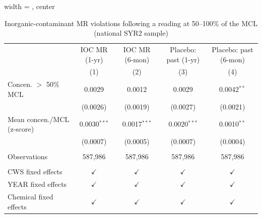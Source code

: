 
\begin{table}[htbp]
\caption{Inorganic-contaminant MR violations following a reading at 50--100\% of the MCL (national SYR2 sample)}\label{tab:mr_concentration_lag_national_ioc}
\centering
\begin{adjustbox}{width = \textwidth, center}
   \begin{tabular}{lcccc}
      \toprule    
                                  & IOC MR (1-yr)   & IOC MR (6-mon)      & Placebo: past (1-yr) & Placebo: past (6-mon) \\   
                                  & (1)             & (2)                 & (3)                  & (4)\\  
      \midrule 
      Concen. $>$ 50\% MCL                   & 0.0029          & 0.0012              & 0.0029               & 0.0042$^{**}$\\   
                                  & (0.0026)        & (0.0019)            & (0.0027)             & (0.0021)\\   
      Mean concen./MCL (z-score)              & 0.0030$^{***}$  & 0.0017$^{***}$      & 0.0020$^{***}$       & 0.0010$^{**}$\\   
                                  & (0.0007)        & (0.0005)            & (0.0007)             & (0.0004)\\   
       \\
      Observations                & 587,986         & 587,986             & 587,986              & 587,986\\  
       \\
      CWS fixed effects         & $\checkmark$    & $\checkmark$        & $\checkmark$         & $\checkmark$\\   
      YEAR fixed effects          & $\checkmark$    & $\checkmark$        & $\checkmark$         & $\checkmark$\\   
      Chemical fixed effects  & $\checkmark$    & $\checkmark$        & $\checkmark$         & $\checkmark$\\   
      \bottomrule
   \end{tabular}
\end{adjustbox}

\end{table}

